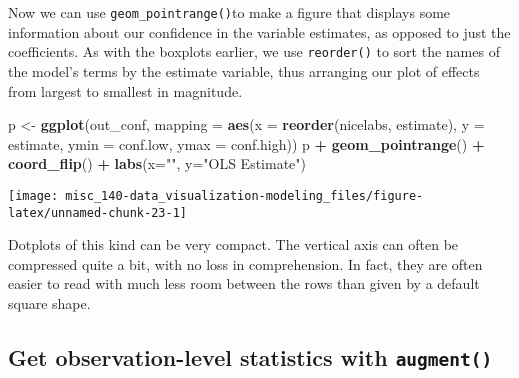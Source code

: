 \documentclass[]{book}
\newenvironment{Shaded}{\begin{snugshade}}{\end{snugshade}}
\newcommand{\DataTypeTok}[1]{\textcolor[rgb]{0.13,0.29,0.53}{#1}}
\newcommand{\KeywordTok}[1]{\textcolor[rgb]{0.13,0.29,0.53}{\textbf{#1}}}
\newcommand{\NormalTok}[1]{#1}
\newcommand{\OperatorTok}[1]{\textcolor[rgb]{0.81,0.36,0.00}{\textbf{#1}}}
\newcommand{\StringTok}[1]{\textcolor[rgb]{0.31,0.60,0.02}{#1}}
\begin{document}
\begin{Shaded}
\end{Shaded}

Now we can use \texttt{geom\_pointrange()}to make a figure that displays some information about our confidence in the variable estimates, as opposed to just the coefficients. As with the boxplots earlier, we use \texttt{reorder()} to sort the names of the model's terms by the estimate variable, thus arranging our plot of effects from largest to smallest in magnitude.

\begin{Shaded}
\begin{Highlighting}[]
\NormalTok{p <-}\StringTok{ }\KeywordTok{ggplot}\NormalTok{(out_conf, }\DataTypeTok{mapping =} \KeywordTok{aes}\NormalTok{(}\DataTypeTok{x =} \KeywordTok{reorder}\NormalTok{(nicelabs, estimate),}
                                    \DataTypeTok{y =}\NormalTok{ estimate, }\DataTypeTok{ymin =}\NormalTok{ conf.low, }\DataTypeTok{ymax =}\NormalTok{ conf.high))}
\NormalTok{p }\OperatorTok{+}\StringTok{ }\KeywordTok{geom_pointrange}\NormalTok{() }\OperatorTok{+}\StringTok{ }\KeywordTok{coord_flip}\NormalTok{() }\OperatorTok{+}\StringTok{ }\KeywordTok{labs}\NormalTok{(}\DataTypeTok{x=}\StringTok{""}\NormalTok{, }\DataTypeTok{y=}\StringTok{"OLS Estimate"}\NormalTok{)}
\end{Highlighting}
\end{Shaded}

\begin{center}\texttt{[image: misc\_140-data\_visualization-modeling\_files/figure-latex/unnamed-chunk-23-1]} \end{center}

Dotplots of this kind can be very compact. The vertical axis can often be compressed quite a bit, with no loss in comprehension. In fact, they are often easier to read with much less room between the rows than given by a default square shape.

\hypertarget{get-observation-level-statistics-with-augment}{%
\subsection{\texorpdfstring{Get observation-level statistics with \texttt{augment()}}{Get observation-level statistics with augment()}}\label{get-observation-level-statistics-with-augment}}
\end{document}
